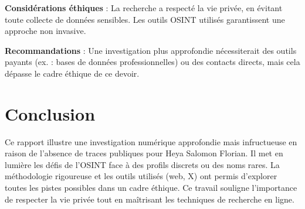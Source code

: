 \documentclass[12pt,a4paper]{article}
\begin{document}
\textbf{Considérations éthiques} : La recherche a respecté la vie privée, en évitant toute collecte de données sensibles. Les outils OSINT utilisés garantissent une approche non invasive.

\textbf{Recommandations} : Une investigation plus approfondie nécessiterait des outils payants (ex. : bases de données professionnelles) ou des contacts directs, mais cela dépasse le cadre éthique de ce devoir.

\section{Conclusion}
Ce rapport illustre une investigation numérique approfondie mais infructueuse en raison de l'absence de traces publiques pour Heya Salomon Florian. Il met en lumière les défis de l'OSINT face à des profils discrets ou des noms rares. La méthodologie rigoureuse et les outils utilisés (web, X) ont permis d'explorer toutes les pistes possibles dans un cadre éthique. Ce travail souligne l'importance de respecter la vie privée tout en maîtrisant les techniques de recherche en ligne.



\end{document}
